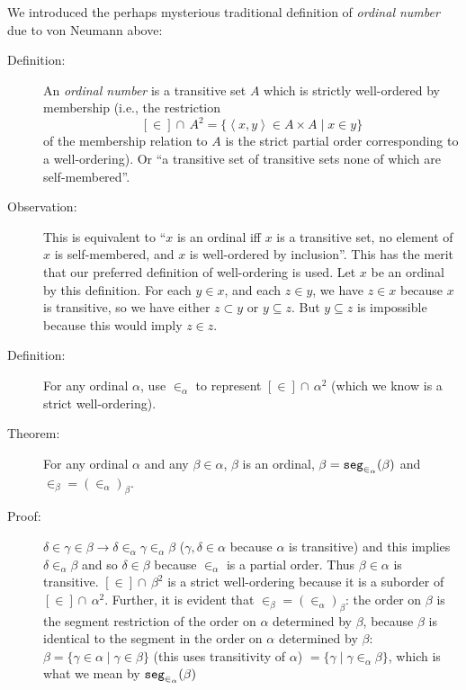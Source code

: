 \documentclass[12pt]{book}
\begin{document}
We introduced the perhaps mysterious traditional definition of {\em
ordinal number\/} due to von Neumann above:

\begin{description}

\item[Definition:] An {\em ordinal number\/} is a transitive set $A$
which is strictly well-ordered by membership (i.e., the restriction $$[\in] \cap\, A^2= \{\left<x,y\right> \in A \times A\mid x \in y\}$$ of
the membership relation to $A$ is the strict partial order
corresponding to a well-ordering).  Or ``a transitive set of
transitive sets none of which are self-membered''.

\item[Observation:] This is equivalent to ``$x$ is an ordinal
iff $x$ is a transitive set, no element of $x$ is self-membered, and
$x$ is well-ordered by inclusion''.  This has the merit that our
preferred definition of well-ordering is used.  Let $x$ be an ordinal
by this definition.  For each $y \in x$, and each $z \in y$, we have
$z \in x$ because $x$ is transitive, so we have either $z \subset y$
or $y \subseteq z$.  But $y \subseteq z$ is impossible because this
would imply $z \in z$.

\item[Definition:] For any ordinal $\alpha$, use $\in_{\alpha}$ to
represent $[\in]\cap\,\alpha^2$ (which we know is a strict
well-ordering).

\item[Theorem:] For any ordinal $\alpha$ and any $\beta \in \alpha$,
$\beta$ is an ordinal, $\beta = {\tt seg}_{\in_{\alpha}}(\beta)$ and
$\in_{\beta} = (\in_{\alpha})_\beta$.

\item[Proof:] $\delta \in \gamma \in \beta \rightarrow \delta
\in_{\alpha} \gamma \in_{\alpha} \beta$ ($\gamma, \delta \in \alpha$
because $\alpha$ is transitive) and this implies $\delta \in_{\alpha}
\beta$ and so $\delta \in \beta$ because $\in_{\alpha}$ is a partial
order.  Thus $\beta \in \alpha$ is transitive.  $[\in]\cap\,\beta^2$ is a
strict well-ordering because it is a suborder of $[\in]\cap\,\alpha^2$.
Further, it is evident that $\in_{\beta} = (\in_{\alpha})_{\beta}$:
the order on $\beta$ is the segment restriction of the order on
$\alpha$ determined by $\beta$, because $\beta$ is identical to the
segment in the order on $\alpha$ determined by $\beta$: $\beta =
\{\gamma \in \alpha \mid \gamma \in \beta\}$ (this uses transitivity
of $\alpha$) $= \{\gamma \mid \gamma \in_{\alpha} \beta\}$, which is what we mean by ${\tt seg}_{\in_{\alpha}}(\beta)$


\end{description}
\end{document}
